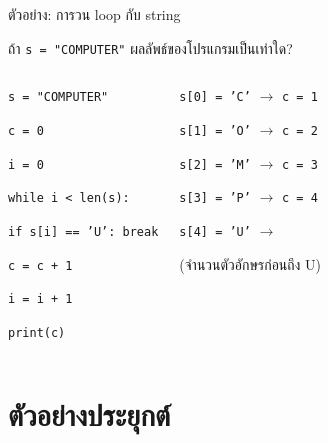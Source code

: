 \documentclass[11pt, aspectratio=169]{beamer}
\newcommand{\py}[1]{\texttt{#1}}
\begin{document}
\begin{frame}{ตัวอย่าง: การวน loop กับ string}
  \begin{exambox}[โจทย์]
    ถ้า \py{s = "COMPUTER"} ผลลัพธ์ของโปรแกรมเป็นเท่าใด?
  \end{exambox}
  \begin{columns}[T]
      \begin{exambox}[โปรแกรม]
        \py{s = "COMPUTER"}

        \py{c = 0}

        \py{i = 0}

        \py{while i < len(s):}

        \qquad \py{if s[i] == 'U': break}

        \qquad \py{c = c + 1}

        \qquad \py{i = i + 1}

        \py{print(c)}
      \end{exambox}
      \begin{solbox}[วิธีตามรอย]
        \py{s[0] = 'C'} $\rightarrow$ \py{c = 1}

        \py{s[1] = 'O'} $\rightarrow$ \py{c = 2}

        \py{s[2] = 'M'} $\rightarrow$ \py{c = 3}

        \py{s[3] = 'P'} $\rightarrow$ \py{c = 4}

        \py{s[4] = 'U'} $\rightarrow$ 

        \highlight{แสดงผล \py{4}} (จำนวนตัวอักษรก่อนถึง U)
      \end{solbox}
  \end{columns}
\end{frame}

\section{ตัวอย่างประยุกต์}
\end{document}
